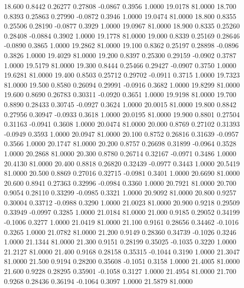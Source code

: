   18.600   0.8442   0.26277   0.27808  -0.0867   0.3956   1.0000  19.0178  81.0000
  18.700   0.8393   0.25863   0.27990  -0.0872   0.3946   1.0000  19.0474  81.0000
  18.800   0.8355   0.25506   0.28190  -0.0877   0.3929   1.0000  19.0967  81.0000
  18.900   0.8335   0.25260   0.28408  -0.0884   0.3902   1.0000  19.1778  81.0000
  19.000   0.8339   0.25169   0.28646  -0.0890   0.3865   1.0000  19.2862  81.0000
  19.100   0.8362   0.25197   0.28898  -0.0896   0.3826   1.0000  19.4029  81.0000
  19.200   0.8397   0.25300   0.29159  -0.0902   0.3787   1.0000  19.5179  81.0000
  19.300   0.8444   0.25466   0.29427  -0.0907   0.3750   1.0000  19.6281  81.0000
  19.400   0.8503   0.25712   0.29702  -0.0911   0.3715   1.0000  19.7323  81.0000
  19.500   0.8580   0.26094   0.29991  -0.0916   0.3682   1.0000  19.8299  81.0000
  19.600   0.8690   0.26783   0.30311  -0.0920   0.3651   1.0000  19.9198  81.0000
  19.700   0.8890   0.28433   0.30745  -0.0927   0.3624   1.0000  20.0015  81.0000
  19.800   0.8842   0.27956   0.30947  -0.0933   0.3618   1.0000  20.0195  81.0000
  19.900   0.8801   0.27504   0.31163  -0.0941   0.3608   1.0000  20.0474  81.0000
  20.000   0.8769   0.27102   0.31393  -0.0949   0.3593   1.0000  20.0947  81.0000
  20.100   0.8752   0.26816   0.31639  -0.0957   0.3566   1.0000  20.1747  81.0000
  20.200   0.8757   0.26698   0.31899  -0.0964   0.3528   1.0000  20.2868  81.0000
  20.300   0.8780   0.26714   0.32167  -0.0971   0.3486   1.0000  20.4130  81.0000
  20.400   0.8818   0.26820   0.32439  -0.0977   0.3443   1.0000  20.5419  81.0000
  20.500   0.8869   0.27016   0.32715  -0.0981   0.3401   1.0000  20.6690  81.0000
  20.600   0.8941   0.27363   0.32996  -0.0984   0.3360   1.0000  20.7921  81.0000
  20.700   0.9054   0.28110   0.33299  -0.0985   0.3321   1.0000  20.9092  81.0000
  20.800   0.9257   0.30004   0.33712  -0.0988   0.3290   1.0000  21.0023  81.0000
  20.900   0.9218   0.29509   0.33949  -0.0997   0.3285   1.0000  21.0184  81.0000
  21.000   0.9185   0.29052   0.34199  -0.1006   0.3277   1.0000  21.0419  81.0000
  21.100   0.9161   0.28656   0.34462  -0.1016   0.3265   1.0000  21.0782  81.0000
  21.200   0.9149   0.28360   0.34739  -0.1026   0.3246   1.0000  21.1344  81.0000
  21.300   0.9151   0.28199   0.35025  -0.1035   0.3220   1.0000  21.2127  81.0000
  21.400   0.9168   0.28158   0.35315  -0.1044   0.3190   1.0000  21.3047  81.0000
  21.500   0.9194   0.28200   0.35608  -0.1051   0.3158   1.0000  21.4005  81.0000
  21.600   0.9228   0.28295   0.35901  -0.1058   0.3127   1.0000  21.4954  81.0000
  21.700   0.9268   0.28436   0.36194  -0.1064   0.3097   1.0000  21.5879  81.0000
